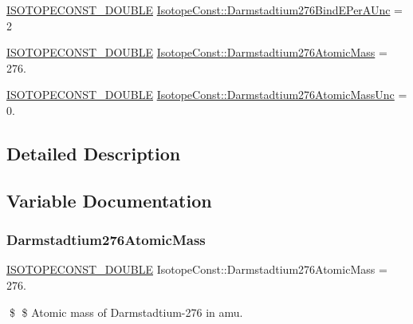\begin{DoxyCompactItemize}
\item 
\mbox{\hyperlink{group___isotope_const-_macros_ga8f45a7272ce02c0b4c65c44636ed719a}{I\+S\+O\+T\+O\+P\+E\+C\+O\+N\+S\+T\+\_\+\+D\+O\+U\+B\+LE}} \mbox{\hyperlink{group___isotope_const-_darmstadtium-_ds276_gafdb3a72205c0ff4ddec439f1af0f5308}{Isotope\+Const\+::\+Darmstadtium276\+Bind\+E\+Per\+A\+Unc}} = 2
\item 
\mbox{\hyperlink{group___isotope_const-_macros_ga8f45a7272ce02c0b4c65c44636ed719a}{I\+S\+O\+T\+O\+P\+E\+C\+O\+N\+S\+T\+\_\+\+D\+O\+U\+B\+LE}} \mbox{\hyperlink{group___isotope_const-_darmstadtium-_ds276_ga0e22688d61a63036f5fff228d009b961}{Isotope\+Const\+::\+Darmstadtium276\+Atomic\+Mass}} = 276.
\item 
\mbox{\hyperlink{group___isotope_const-_macros_ga8f45a7272ce02c0b4c65c44636ed719a}{I\+S\+O\+T\+O\+P\+E\+C\+O\+N\+S\+T\+\_\+\+D\+O\+U\+B\+LE}} \mbox{\hyperlink{group___isotope_const-_darmstadtium-_ds276_gaf99989c690945e2677890f5e5662d81d}{Isotope\+Const\+::\+Darmstadtium276\+Atomic\+Mass\+Unc}} = 0.
\end{DoxyCompactItemize}


\subsection{Detailed Description}


\subsection{Variable Documentation}
\mbox{\label{group___isotope_const-_darmstadtium-_ds276_ga0e22688d61a63036f5fff228d009b961}} 
\subsubsection{\texorpdfstring{Darmstadtium276\+Atomic\+Mass}{Darmstadtium276AtomicMass}}
{\footnotesize\ttfamily \mbox{\hyperlink{group___isotope_const-_macros_ga8f45a7272ce02c0b4c65c44636ed719a}{I\+S\+O\+T\+O\+P\+E\+C\+O\+N\+S\+T\+\_\+\+D\+O\+U\+B\+LE}} Isotope\+Const\+::\+Darmstadtium276\+Atomic\+Mass = 276.}

\$ \$ Atomic mass of Darmstadtium-\/276 in amu. \mbox{\label{group___isotope_const-_darmstadtium-_ds276_gaf99989c690945e2677890f5e5662d81d}} 
